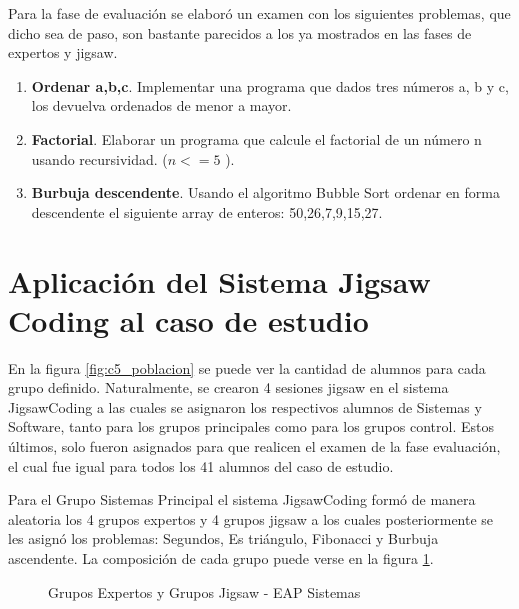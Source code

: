 Para la fase de evaluación se elaboró un examen con los siguientes problemas, que dicho sea de paso, son bastante parecidos a los ya mostrados en las fases de expertos y jigsaw.

\begin{enumerate}
	\item \textbf{Ordenar a,b,c}. Implementar una programa que dados tres números a, b y c, los devuelva ordenados de menor a mayor.
	\item \textbf{Factorial}. Elaborar un programa que calcule el factorial de un número n usando recursividad. ($n <= 5$ ).
	\item \textbf{Burbuja descendente}. Usando el algoritmo Bubble Sort ordenar en forma descendente el siguiente array de enteros: 50,26,7,9,15,27.
\end{enumerate}

\section{Aplicación del Sistema Jigsaw Coding al caso de estudio}

En la figura \ref{fig:c5_poblacion} se puede ver la cantidad de alumnos para cada grupo definido. Naturalmente, se crearon 4 sesiones jigsaw en el sistema JigsawCoding a las cuales se asignaron los respectivos alumnos de Sistemas y Software, tanto para los grupos principales como para los grupos control. Estos últimos, solo fueron asignados para que realicen el examen de la fase evaluación, el cual fue igual para todos los 41 alumnos del caso de estudio.

Para el Grupo Sistemas Principal el sistema JigsawCoding formó de manera aleatoria los 4 grupos expertos y 4 grupos jigsaw a los cuales posteriormente se les asignó los problemas: Segundos, Es triángulo, Fibonacci y Burbuja ascendente. La composición de cada grupo puede verse en la figura \ref{fig:c5_sistemas_grupos}.

\begin{figure}[!h]
	\centering
	\caption{Grupos Expertos y Grupos Jigsaw - EAP Sistemas}
	\label{fig:c5_sistemas_grupos}
\end{figure}

